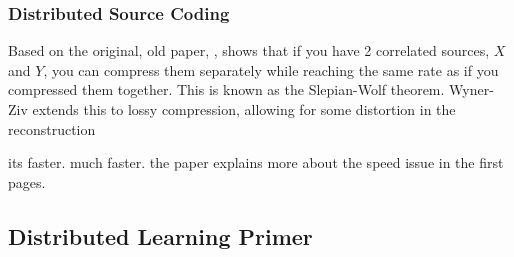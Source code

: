 
\subsubsection{Distributed Source Coding}
Based on the original, old paper, \cite{SlepianWolf}, shows that if you have 2 correlated sources, $X$ and $Y$, you can compress them separately while reaching the same rate as if you compressed them together. This is known as the Slepian-Wolf theorem. Wyner-Ziv extends this to lossy compression, allowing for some distortion in the reconstruction



its faster. much faster. the paper \cite{OzyilkanRecoverBinning} explains more about the speed issue in the first pages.



\subsection{Distributed Learning Primer}




